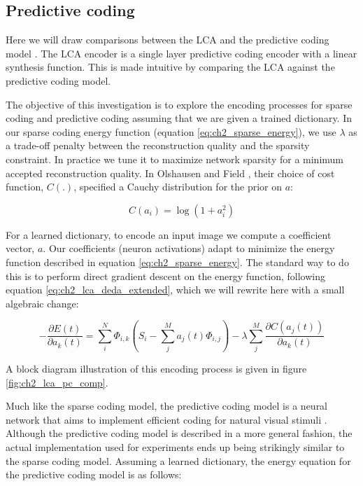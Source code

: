 \subsection{Predictive coding}
Here we will draw comparisons between the LCA and the predictive coding model \parencite{rao1999predictive}. The LCA encoder is a single layer predictive coding encoder with a linear synthesis function. This is made intuitive by comparing the LCA against the predictive coding model.

The objective of this investigation is to explore the encoding processes for sparse coding and predictive coding assuming that we are given a trained dictionary. In our sparse coding energy function (equation \eqref{eq:ch2_sparse_energy}), we use $\lambda$ as a trade-off penalty between the reconstruction quality and the sparsity constraint. In practice we tune it to maximize network sparsity for a minimum accepted reconstruction quality. In Olshausen and Field \citeyearpar{olshausen1997sparse}, their choice of cost function, $C(.)$, specified a Cauchy distribution for the prior on $a$:

\begin{equation}\label{eq:ch2_cauchy_cost}
  C(a_{i}) = \log(1+a_{i}^{2})
\end{equation}

For a learned dictionary, to encode an input image we compute a coefficient vector, $a$. Our coefficients (neuron activations) adapt to minimize the energy function described in equation \eqref{eq:ch2_sparse_energy}. The standard way to do this is to perform direct gradient descent on the energy function, following equation \eqref{eq:ch2_lca_deda_extended}, which we will rewrite here with a small algebraic change:

\begin{equation}\label{eq:ch2_sc_deda_rewrite}
    - \frac{\partial E(t)}{\partial a_{k}(t)}
    =
        \sum\limits_{i}^{N} \Phi_{i,k} \left(S_{i} - \sum\limits_{j}^{M}a_{j}(t) \Phi_{i,j}\right) -
        \lambda \sum\limits_{j}^{M}\frac{\partial C(a_{j}(t))}{\partial a_{k}(t)}
\end{equation}

A block diagram illustration of this encoding process is given in figure \ref{fig:ch2_lca_pc_comp}.

Much like the sparse coding model, the predictive coding model is a neural network that aims to implement efficient coding for natural visual stimuli \parencite{rao1997dynamic, rao1999predictive}. Although the predictive coding model is described in a more general fashion, the actual implementation used for experiments ends up being strikingly similar to the sparse coding model. Assuming a learned dictionary, the energy equation for the predictive coding model is as follows:

